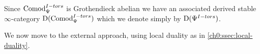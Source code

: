 


\begin{notation}
    Since $\mathrm{Comod}_\Psi^{I-tors}$ is Grothendieck abelian we have an associated derived stable $\infty$-category $\mathrm{D}(\mathrm{Comod}_\Psi^{I-tors})$ which we denote simply by $\mathrm{D}(\Psi^{I-tors})$.
\end{notation}





We now move to the external approach, using local duality as in \cref{ch0:ssec:local-duality}. 

